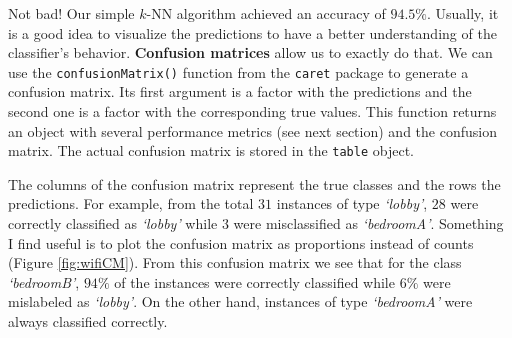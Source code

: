 \documentclass[
  11pt,
]{krantz}
\newenvironment{Shaded}{\begin{snugshade}}{\end{snugshade}}
\newcommand{\CommentTok}[1]{\textcolor[rgb]{0.37,0.37,0.37}{\textit{#1}}}
\newcommand{\FunctionTok}[1]{\textcolor[rgb]{0,0,0}{#1}}
\newcommand{\NormalTok}[1]{#1}
\newcommand{\OtherTok}[1]{\textcolor[rgb]{0.37,0.37,0.37}{#1}}
\newcommand{\SpecialCharTok}[1]{\textcolor[rgb]{0,0,0}{#1}}
\begin{document}
Not bad! Our simple \(k\)-NN algorithm achieved an accuracy of \(94.5\%\). Usually, it is a good idea to visualize the predictions to have a better understanding of the classifier's behavior. \textbf{Confusion matrices} allow us to exactly do that. We can use the \texttt{confusionMatrix()} function from the \texttt{caret} package to generate a confusion matrix. Its first argument is a factor with the predictions and the second one is a factor with the corresponding true values. This function returns an object with several performance metrics (see next section) and the confusion matrix. The actual confusion matrix is stored in the \texttt{table} object.

\begin{Shaded}
\end{Shaded}

The columns of the confusion matrix represent the true classes and the rows the predictions. For example, from the total \(31\) instances of type \emph{`lobby'}, \(28\) were correctly classified as \emph{`lobby'} while \(3\) were misclassified as \emph{`bedroomA'}. Something I find useful is to plot the confusion matrix as proportions instead of counts (Figure \ref{fig:wifiCM}). From this confusion matrix we see that for the class \emph{`bedroomB'}, \(94\%\) of the instances were correctly classified while \(6\%\) were mislabeled as \emph{`lobby'}. On the other hand, instances of type \emph{`bedroomA'} were always classified correctly.
\end{document}
